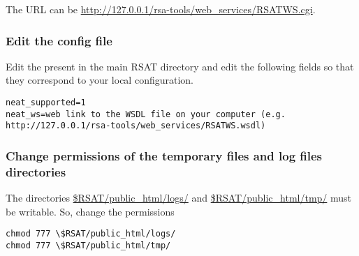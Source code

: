 \documentclass{book}
\begin{document}
The URL can be \url{http://127.0.0.1/rsa-tools/web_services/RSATWS.cgi}.

\subsubsection{Edit the \neat config file}

Edit the  present in the main RSAT directory and edit the following fields so that they correspond to your local configuration.

\begin{footnotesize} 
\begin{verbatim}
neat_supported=1
neat_ws=web link to the WSDL file on your computer (e.g. http://127.0.0.1/rsa-tools/web_services/RSATWS.wsdl)
\end{verbatim}
\end{footnotesize}

\subsubsection{Change permissions of the temporary files and log files directories}

The directories \url{\$RSAT/public_html/logs/} and \url{\$RSAT/public_html/tmp/} must be writable. So, change the permissions

\begin{footnotesize} 
\begin{verbatim}
chmod 777 \$RSAT/public_html/logs/
chmod 777 \$RSAT/public_html/tmp/
\end{verbatim}
\end{footnotesize}
\end{document}
